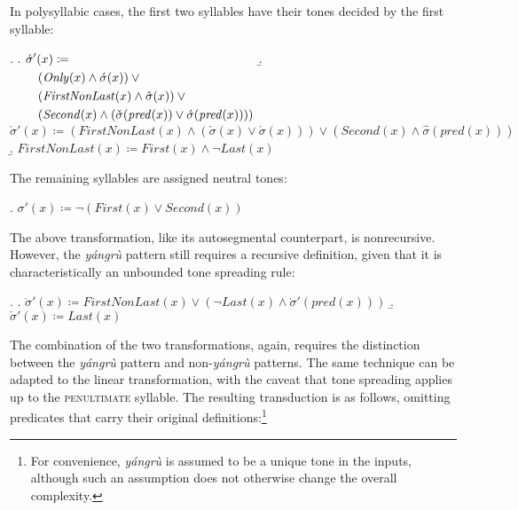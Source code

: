 \documentclass[12pt, a4paper]{report}
\newcommand{\shift}{\hspace*{1em}}
\newcommand{\textemph}[1]{\textsc{#1}}
\newcommand{\textform}[1]{\textit{#1}}
\begin{document}
In polysyllabic cases, the first two syllables have their tones
decided by the first syllable:

\ex.
\a. \(
\begin{aligned}[t]
  & \acute{\sigma}'(x) \coloneq \mbox{}\\
  &\shift (\mathit{Only}(x) \land \acute{\sigma}(x)) \lor \mbox{}\\
  &\shift (\mathit{FirstNonLast}(x) \land
    \hat{\sigma}(x)) \lor \mbox{}\\
  &\shift (\mathit{Second}(x) \land
    (\check{\sigma}(\mathit{pred}(x)) \lor
    \acute{\sigma}(\mathit{pred}(x))))
\end{aligned}\)
\b. \(\grave{\sigma}'(x) \coloneq
(\mathit{FirstNonLast}(x) \land
(\check{\sigma}(x) \lor \acute{\sigma}(x))) \lor
(\mathit{Second}(x) \land \hat{\sigma}(\mathit{pred}(x)))\)
\b. \(\mathit{FirstNonLast}(x) \coloneq
\mathit{First}(x) \land \neg\mathit{Last}(x)\)

The remaining syllables are assigned neutral tones:

\ex. \(\sigma'(x) \coloneq
\neg(\mathit{First}(x) \lor \mathit{Second}(x))\)


The above transformation, like its autosegmental counterpart, is
nonrecursive.  However, the \textform{yángrù} pattern still requires a
recursive definition, given that it is characteristically an unbounded
tone spreading rule:

\ex.
\a. \(\grave{\sigma}'(x) \coloneq
\mathit{FirstNonLast}(x) \lor
(\neg\mathit{Last}(x) \land \grave{\sigma}'(\mathit{pred}(x)))\)
\b. \(\check{\sigma}'(x) \coloneq \mathit{Last}(x)\)

The combination of the two transformations, again, requires the
distinction between the \textform{yángrù} pattern and
non-\textform{yángrù} patterns.  The same technique can be adapted to
the linear transformation, with the caveat that tone spreading applies
up to the \textemph{penultimate} syllable.  The resulting transduction
is as follows, omitting predicates that carry their original
definitions:\footnote{For convenience, \textform{yángrù} is assumed to
  be a unique tone in the inputs, although such an assumption does not
  otherwise change the overall complexity.}
\end{document}
